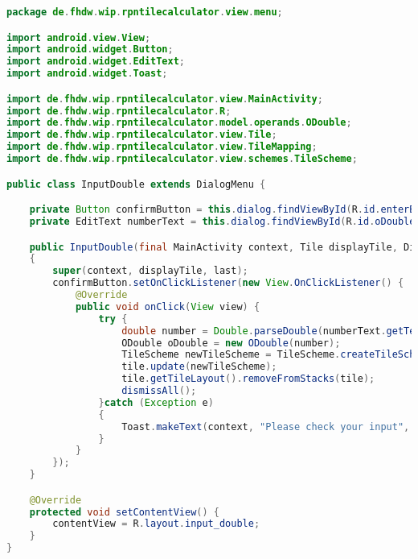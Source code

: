 \begin{lstlisting}[caption=InputDouble,label=list:InputDouble,language=Java]
package de.fhdw.wip.rpntilecalculator.view.menu;

import android.view.View;
import android.widget.Button;
import android.widget.EditText;
import android.widget.Toast;

import de.fhdw.wip.rpntilecalculator.view.MainActivity;
import de.fhdw.wip.rpntilecalculator.R;
import de.fhdw.wip.rpntilecalculator.model.operands.ODouble;
import de.fhdw.wip.rpntilecalculator.view.Tile;
import de.fhdw.wip.rpntilecalculator.view.TileMapping;
import de.fhdw.wip.rpntilecalculator.view.schemes.TileScheme;

public class InputDouble extends DialogMenu {

    private Button confirmButton = this.dialog.findViewById(R.id.enterButton3);
    private EditText numberText = this.dialog.findViewById(R.id.oDouble_input);

    public InputDouble(final MainActivity context, Tile displayTile, DialogMenu last)
    {
        super(context, displayTile, last);
        confirmButton.setOnClickListener(new View.OnClickListener() {
            @Override
            public void onClick(View view) {
                try {
                    double number = Double.parseDouble(numberText.getText().toString());
                    ODouble oDouble = new ODouble(number);
                    TileScheme newTileScheme = TileScheme.createTileScheme(TileMapping.O_DOUBLE, oDouble, 0);
                    tile.update(newTileScheme);
                    tile.getTileLayout().removeFromStacks(tile);
                    dismissAll();
                }catch (Exception e)
                {
                    Toast.makeText(context, "Please check your input", Toast.LENGTH_SHORT).show();
                }
            }
        });
    }

    @Override
    protected void setContentView() {
        contentView = R.layout.input_double;
    }
}
\end{lstlisting}    

